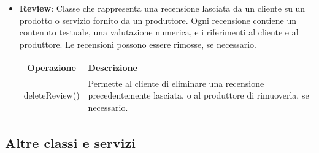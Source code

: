\begin{itemize}
\item \textbf{Review}:
Classe che rappresenta una recensione lasciata da un cliente su un prodotto o servizio fornito da un produttore. Ogni recensione contiene un contenuto testuale, una valutazione numerica, e i riferimenti al cliente e al produttore. Le recensioni possono essere rimosse, se necessario.
\begin{table}[!htbp]
    \centering
    \begin{tabularx}{\textwidth}{| c | X |}
    \hline
         \textbf{Operazione} & \textbf{Descrizione} \\
         \hline
         deleteReview() & Permette al cliente di eliminare una recensione precedentemente lasciata, o al produttore di rimuoverla, se necessario. \\
         \hline
    \end{tabularx}
\end{table}

\end{itemize}


\subsection{Altre classi e servizi}

